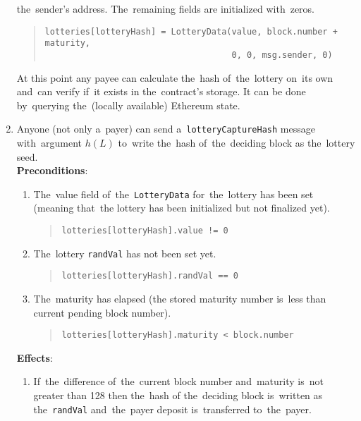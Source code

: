 \documentclass[a4paper]{article}
\newcommand{\lotteryhash}[1]{h({#1})}
\begin{document}
\begin{enumerate}
            the~sender's address. The~remaining fields are initialized with~zeros.
            \begin{quote}
              \verb!lotteries[lotteryHash] = LotteryData(value, block.number + maturity,!\\
              \verb!                                     0, 0, msg.sender, 0)!
            \end{quote}
            At this point any payee can calculate the~hash of~the~lottery on~its own and~can verify if~it exists in
            the~contract's storage. It can be done by~querying the~(locally available) Ethereum state.
        \item Anyone (not only a~payer) can send a~\texttt{lotteryCaptureHash} message with~argument $\lotteryhash{L}$ to~write
            the~hash of~the~deciding block as the~lottery seed.\\
            \textbf{Preconditions}:
            \begin{enumerate}
                \item The~value field of~the~\texttt{LotteryData} for~the~lottery has been set (meaning that~the
                lottery has been initialized but not finalized yet).
                \begin{quote}
                  \verb|lotteries[lotteryHash].value != 0|
                \end{quote}
                \item The~lottery \texttt{randVal} has not been set yet.
                  \begin{quote}
	            \verb!lotteries[lotteryHash].randVal == 0!
	          \end{quote}
                \item The~maturity has elapsed (the stored maturity number is~less than current pending block number).
                  \begin{quote}
                    \verb!lotteries[lotteryHash].maturity < block.number!
                  \end{quote}
	        \end{enumerate}
        \textbf{Effects}:
        \begin{enumerate}
            \item  If~the~difference of~the~current block number and~maturity is~not greater than 128 then the~hash of
                the~deciding block is~written as the~\texttt{randVal} and~the~payer deposit is~transferred to~the~payer.
                \begin{quote}

\end{quote}
\end{enumerate}
\end{enumerate}
\end{document}
